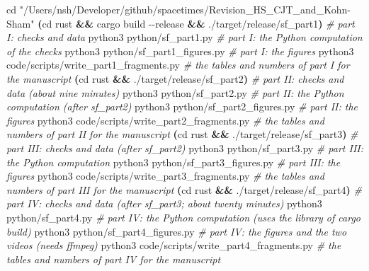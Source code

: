 \documentclass[
  10pt,
]{article}
\newenvironment{Shaded}{}{}
\newcommand{\AttributeTok}[1]{\textcolor[rgb]{0.49,0.56,0.16}{#1}}
\newcommand{\BuiltInTok}[1]{\textcolor[rgb]{0.00,0.50,0.00}{#1}}
\newcommand{\CommentTok}[1]{\textcolor[rgb]{0.38,0.63,0.69}{\textit{#1}}}
\newcommand{\ExtensionTok}[1]{#1}
\newcommand{\KeywordTok}[1]{\textcolor[rgb]{0.00,0.44,0.13}{\textbf{#1}}}
\newcommand{\NormalTok}[1]{#1}
\newcommand{\StringTok}[1]{\textcolor[rgb]{0.25,0.44,0.63}{#1}}
\begin{document}
\begin{Shaded}
\begin{Highlighting}[]
\BuiltInTok{cd} \StringTok{"/Users/nsh/Developer/github/spacetimes/Revision\_HS\_CJT\_and\_Kohn{-}Sham"}
\KeywordTok{(}\BuiltInTok{cd}\NormalTok{ rust }\KeywordTok{\&\&} \ExtensionTok{cargo}\NormalTok{ build }\AttributeTok{{-}{-}release} \KeywordTok{\&\&} \ExtensionTok{./target/release/sf\_part1}\KeywordTok{)}   \CommentTok{\# part I: checks and data}
\ExtensionTok{python3}\NormalTok{ python/sf\_part1.py                    }\CommentTok{\# part I: the Python computation of the checks}
\ExtensionTok{python3}\NormalTok{ python/sf\_part1\_figures.py            }\CommentTok{\# part I: the figures}
\ExtensionTok{python3}\NormalTok{ code/scripts/write\_part1\_fragments.py }\CommentTok{\# the tables and numbers of part I for the manuscript}
\KeywordTok{(}\BuiltInTok{cd}\NormalTok{ rust }\KeywordTok{\&\&} \ExtensionTok{./target/release/sf\_part2}\KeywordTok{)}        \CommentTok{\# part II: checks and data (about nine minutes)}
\ExtensionTok{python3}\NormalTok{ python/sf\_part2.py                    }\CommentTok{\# part II: the Python computation (after sf\_part2)}
\ExtensionTok{python3}\NormalTok{ python/sf\_part2\_figures.py            }\CommentTok{\# part II: the figures}
\ExtensionTok{python3}\NormalTok{ code/scripts/write\_part2\_fragments.py }\CommentTok{\# the tables and numbers of part II for the manuscript}
\KeywordTok{(}\BuiltInTok{cd}\NormalTok{ rust }\KeywordTok{\&\&} \ExtensionTok{./target/release/sf\_part3}\KeywordTok{)}        \CommentTok{\# part III: checks and data (after sf\_part2)}
\ExtensionTok{python3}\NormalTok{ python/sf\_part3.py                    }\CommentTok{\# part III: the Python computation}
\ExtensionTok{python3}\NormalTok{ python/sf\_part3\_figures.py            }\CommentTok{\# part III: the figures}
\ExtensionTok{python3}\NormalTok{ code/scripts/write\_part3\_fragments.py }\CommentTok{\# the tables and numbers of part III for the manuscript}
\KeywordTok{(}\BuiltInTok{cd}\NormalTok{ rust }\KeywordTok{\&\&} \ExtensionTok{./target/release/sf\_part4}\KeywordTok{)}        \CommentTok{\# part IV: checks and data (after sf\_part3; about twenty minutes)}
\ExtensionTok{python3}\NormalTok{ python/sf\_part4.py                    }\CommentTok{\# part IV: the Python computation (uses the library of cargo build)}
\ExtensionTok{python3}\NormalTok{ python/sf\_part4\_figures.py            }\CommentTok{\# part IV: the figures and the two videos (needs ffmpeg)}
\ExtensionTok{python3}\NormalTok{ code/scripts/write\_part4\_fragments.py }\CommentTok{\# the tables and numbers of part IV for the manuscript}

\end{Highlighting}
\end{Shaded}
\end{document}

